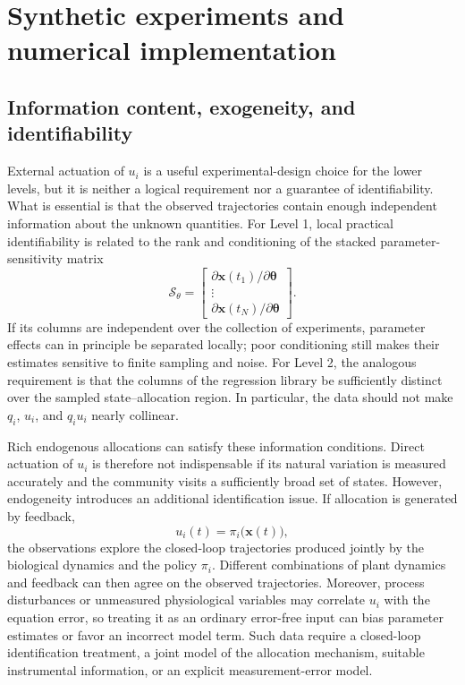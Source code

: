 \documentclass[11pt,a4paper]{article}
\newcommand{\vect}[1]{\boldsymbol{#1}}
\begin{document}
\section{Synthetic experiments and numerical implementation}

\subsection{Information content, exogeneity, and identifiability}

External actuation of \(u_i\) is a useful experimental-design choice for the
lower levels, but it is neither a logical requirement nor a guarantee of
identifiability. What is essential is that the observed trajectories contain
enough independent information about the unknown quantities. For Level 1,
local practical identifiability is related to the rank and conditioning of
the stacked parameter-sensitivity matrix
\begin{equation}
  \mathcal{S}_{\theta} =
  \begin{bmatrix}
    \partial\vect{x}(t_1)/\partial\vect{\theta}\\
    \vdots\\
    \partial\vect{x}(t_N)/\partial\vect{\theta}
  \end{bmatrix}.
\end{equation}
If its columns are independent over the collection of experiments, parameter
effects can in principle be separated locally; poor conditioning still makes
their estimates sensitive to finite sampling and noise. For Level 2, the
analogous requirement is that the columns of the regression library be
sufficiently distinct over the sampled state--allocation region. In
particular, the data should not make \(q_i\), \(u_i\), and \(q_i u_i\) nearly
collinear.

Rich endogenous allocations can satisfy these information conditions. Direct
actuation of \(u_i\) is therefore not indispensable if its natural variation
is measured accurately and the community visits a sufficiently broad set of
states. However, endogeneity introduces an additional identification issue.
If allocation is generated by feedback,
\begin{equation}
  u_i(t)=\pi_i\bigl(\vect{x}(t)\bigr),
\end{equation}
the observations explore the closed-loop trajectories produced jointly by
the biological dynamics and the policy \(\pi_i\). Different combinations of
plant dynamics and feedback can then agree on the observed trajectories.
Moreover, process disturbances or unmeasured physiological variables may
correlate \(u_i\) with the equation error, so treating it as an ordinary
error-free input can bias parameter estimates or favor an incorrect model
term. Such data require a closed-loop identification treatment, a joint model
of the allocation mechanism, suitable instrumental information, or an
explicit measurement-error model.
\end{document}
